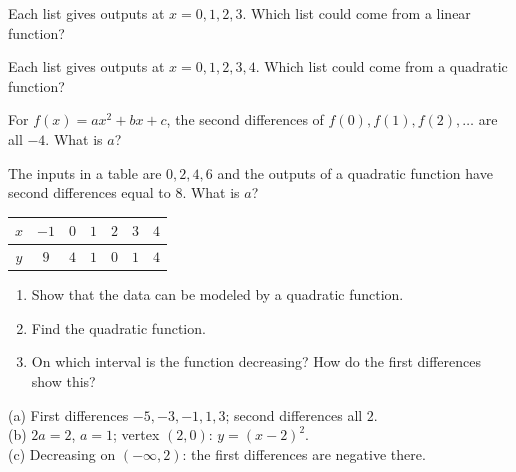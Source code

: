 \begin{exo}{}
Each list gives outputs at $x=0,1,2,3$. Which list could come from a linear function?
\end{exo}
\begin{exo}{}
Each list gives outputs at $x=0,1,2,3,4$. Which list could come from a quadratic function?
\end{exo}
\begin{exo}{}
For $f(x)=ax^2+bx+c$, the second differences of $f(0),f(1),f(2),\dots$ are all $-4$. What is $a$?
\end{exo}
\begin{exo}{}
The inputs in a table are $0,2,4,6$ and the outputs of a quadratic function have second differences equal to $8$. What is $a$?
\end{exo}
\begin{exo}{}
\begin{center}\begin{tabular}{c|cccccc}$x$&$-1$&$0$&$1$&$2$&$3$&$4$\\\hline$y$&$9$&$4$&$1$&$0$&$1$&$4$\end{tabular}\end{center}
\begin{enumerate}[label=(\alph*)]
\item Show that the data can be modeled by a quadratic function.
\item Find the quadratic function.
\item On which interval is the function decreasing? How do the first differences show this?
\end{enumerate}
\begin{solution}
(a) First differences $-5,-3,-1,1,3$; second differences all $2$.\\
(b) $2a=2$, $a=1$; vertex $(2,0)$: $y=(x-2)^2$.\\
(c) Decreasing on $(-\infty,2)$: the first differences are negative there.
\end{solution}
\end{exo}

